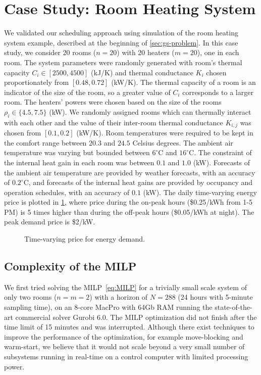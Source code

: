 \section{Case Study: Room Heating System}
\label{sec:simulation}

We validated our scheduling approach using simulation of the room heating system example, described at the beginning of \cref{sec:gs-problem}.
In this case study, we consider 20 rooms ($n=20$) with 20 heaters ($m=20$), one in each room.
The system parameters were randomly generated with room's thermal capacity $C_i \in [2500, 4500]$ (kJ/K) and thermal conductance $K_i$ chosen proportionately from $[0.48,0.72]$ (kW/K).
The thermal capacity of a room is an indicator of the size of the room, so a greater value of $C_{i}$ corresponds to a larger room.
The heaters' powers were chosen based on the size of the rooms $\rho_i \in \{4.5, 7.5\}$ (kW).
We randomly assigned rooms which can thermally interact with each other and the value of their inter-room thermal conductance $K_{i,j}$ was chosen from $[0.1,0.2]$ (kW/K). %
Room temperatures were required to be kept in the comfort range between $20.3$ and $24.5$ Celsius degrees.
The ambient air temperature was varying but bounded between $6^{\circ}\mathrm{C}$ and $16^{\circ}\mathrm{C}$. 
The constraint of the internal heat gain in each room was between $0.1$ and $1.0$ (kW).
Forecasts of the ambient air temperature are provided by weather forecasts, with an accuracy of $0.2^{\circ}\mathrm{C}$, and forecasts of the internal heat gains are provided by occupancy and operation schedules, with an accuracy of $0.1$ (kW).
The daily time-varying energy price is plotted in \cref{fig:simulation:price}, where %
 price during the on-peak hours (\$0.25/kWh from 1-5 PM) is 5 times higher than during the off-peak hours (\$0.05/kWh at night).
The peak demand price is \$2/kW.

\begin{figure}[tb]
  \centering
  
  \caption{Time-varying price for energy demand.}
  \label{fig:simulation:price}
\end{figure}


\subsection{Complexity of the MILP} %
\label{sec:simulation:milp}

We first tried solving the MILP~\eqref{eq:MILP} for a trivially small scale system of only two rooms ($n=m=2$) with a horizon of $N=288$ (24 hours with 5-minute sampling time), on an 8-core MacPro with 64Gb RAM running the state-of-the-art commercial solver Gurobi 6.0.
The MILP optimization did not finish after the time limit of 15 minutes and was interrupted.
Although there exist techniques to improve the performance of the optimization, for example move-blocking and warm-start, we believe that it would not scale beyond a very small number of subsystems running in real-time on a control computer with limited processing power.


